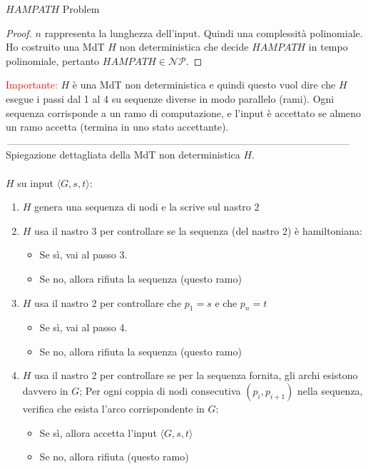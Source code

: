 \documentclass{article}  %
\theoremstyle{definition}
\begin{document}
\begin{theorem}{$HAMPATH$ Problem}
\begin{proof}
		$n$ rappresenta la lunghezza dell'input. Quindi una complessità polinomiale. Ho costruito una MdT $H$ non deterministica che decide $HAMPATH$ in
		tempo polinomiale, pertanto $HAMPATH \in \mathcal{NP}$.
	\end{proof}
	\textcolor{red}{Importante:} $H$ è una MdT non deterministica e quindi questo vuol dire che $H$ esegue i passi dal 1 al 4
	su sequenze diverse in modo parallelo (rami). Ogni sequenza corrisponde a un ramo di computazione, e
	l'input è accettato se almeno un ramo accetta (termina in uno stato accettante).
	$\rule{\linewidth}{0.3pt}$  %
	Spiegazione dettagliata della MdT non deterministica $H$. \\ \\
	$H$ su input $\langle G,s,t \rangle$:
	\begin{enumerate}
		\item $H$ genera una sequenza di nodi e la scrive sul nastro 2
		\item $H$ usa il nastro 3 per controllare se la sequenza (del nastro 2) è hamiltoniana:
		      \begin{itemize}
			      \item Se sì, vai al passo 3.
			      \item Se no, allora rifiuta la sequenza (questo ramo)
		      \end{itemize}
		\item $H$ usa il nastro 2 per controllare che $p_1=s$ e che $p_n=t$
		      \begin{itemize}
			      \item Se sì, vai al passo 4.
			      \item Se no, allora rifiuta la sequenza (questo ramo)
		      \end{itemize}
		\item $H$ usa il nastro 2 per controllare se per la sequenza fornita, gli archi esistono davvero in $G$;
		      Per ogni coppia di nodi consecutiva $(p_i, p_{i+1})$ nella sequenza, verifica che esista l'arco corrispondente in $G$:
		      \begin{itemize}
			      \item Se sì, allora accetta l'input $\langle G,s,t \rangle$
			      \item Se no, allora rifiuta (questo ramo)
		      \end{itemize}
	\end{enumerate}
\end{theorem}
\end{document}
